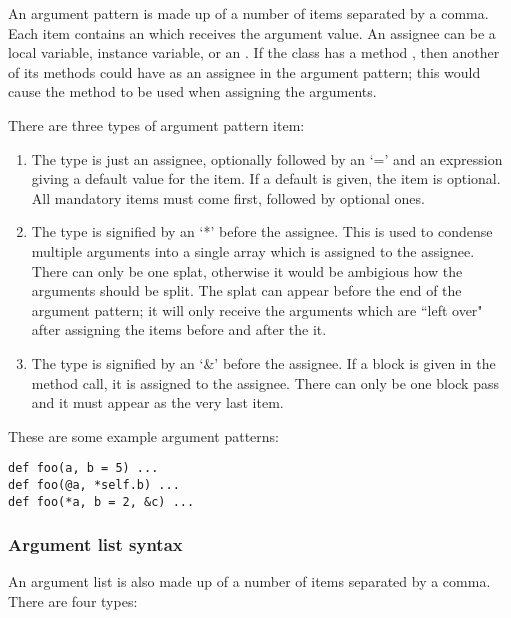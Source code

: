 An argument pattern is made up of a number of items separated by a comma. Each item contains an  which receives the argument value. An assignee can be a local variable, instance variable, or an . If the class has a method , then another of its methods could have  as an assignee in the argument pattern; this would cause the  method to be used when assigning the arguments.

There are three types of argument pattern item:

\begin{enumerate}
  \item The  type is just an assignee, optionally followed by an `=' and an expression giving a default value for the item. If a default is given, the item is optional. All mandatory items must come first, followed by optional ones.
  
  \item The  type is signified by an `*' before the assignee. This is used to condense multiple arguments into a single array which is assigned to the assignee. There can only be one splat, otherwise it would be ambigious how the arguments should be split. The splat can appear before the end of the argument pattern; it will only receive the arguments which are ``left over" after assigning the items before and after the it.
  
  \item The  type is signified by an `\&' before the assignee. If a block is given in the method call, it is assigned to the assignee. There can only be one block pass and it must appear as the very last item.
\end{enumerate}

These are some example argument patterns:

\begin{lstlisting}
def foo(a, b = 5) ...
def foo(@a, *self.b) ...
def foo(*a, b = 2, &c) ...
\end{lstlisting}

\subsubsection{Argument list syntax}

An argument list is also made up of a number of items separated by a comma. There are four types:

